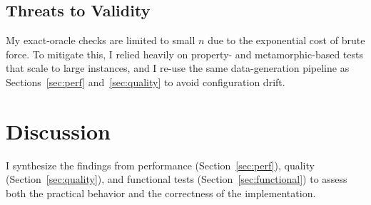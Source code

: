 \documentclass[12pt]{article}
\begin{document}
\subsection{Threats to Validity}
My exact-oracle checks are limited to small $n$ due to the exponential cost of brute force. To mitigate this, I relied heavily on property- and metamorphic-based tests that scale to large instances, and I re-use the same data-generation pipeline as Sections~\ref{sec:perf} and~\ref{sec:quality} to avoid configuration drift.
\section{Discussion}

I synthesize the findings from performance (Section~\ref{sec:perf}), quality (Section~\ref{sec:quality}), and functional tests (Section~\ref{sec:functional}) to assess both the practical behavior and the correctness of the implementation.
\end{document}
